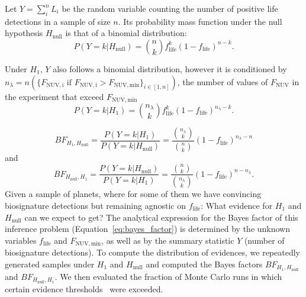 \documentclass[twocolumn,twocolappendix,linenumbers]{aastex631}
\begin{document}
Let $Y=\sum_i^n L_i$ be the random variable counting the number of positive life detections in a sample of size $n$. Its probability mass function under the null hypothesis $H_\mathrm{null}$ is that of a binomial distribution:
\begin{equation}
    \label{eq:semian:likelihoodHnull}
P(Y=k|H_\mathrm{null}) = \binom{n}{k}f_\mathrm{life}^k(1-f_\mathrm{life})^{n-k}.
\end{equation}

Under $H_1$, $Y$ also follows a binomial distribution, however it is conditioned by $n_{\lambda} = n(\{F_\mathrm{NUV, i} \text{ if } F_\mathrm{NUV, i}>F_\mathrm{NUV, min}\}_{i \in [1,n]})$, the number of values of $F_\mathrm{NUV}$ in the experiment that exceed $F_\mathrm{NUV, min}$
\begin{equation}
\label{eq:semian:likelihoodH1}
P(Y=k|H_1) = \binom{n_{\lambda}}{k}f_\mathrm{life}^k(1-f_\mathrm{life})^{n_{\lambda}-k}.
\end{equation}

\begin{equation}\label{eq:bayes_factor}
BF_{H_1,H_\mathrm{null}} = \frac{P(Y=k|H_1)}{P(Y=k|H_\mathrm{null})} = \frac{\binom{n_\lambda}{k}}{\binom{n}{k}}(1-f_\mathrm{life})^{n_{\lambda}-n}
\end{equation}
and
\begin{equation}
    \label{eq:bayes_factor2}
BF_{H_\mathrm{null},H_1} = \frac{P(Y=k|H_\mathrm{null})}{P(Y=k|H_1)} = \frac{\binom{n}{k}}{\binom{n_\lambda}{k}}(1-f_\mathrm{life})^{n-n_{\lambda}}.
\end{equation}
Given a sample of planets, where for some of them we have convincing biosignature detections but remaining agnostic on $f_\mathrm{life}$: What evidence for $H_\mathrm{1}$ and $H_\mathrm{null}$ can we expect to get?
The analytical expression for the Bayes factor of this inference problem (Equation~\ref{eq:bayes_factor}) is determined by the unknown variables $f_\mathrm{life}$ and $F_\mathrm{NUV, min}$, as well as by the summary statistic $Y$ (number of biosignature detections).
To compute the distribution of evidences, we repeatedly generated samples under $H_\mathrm{1}$ and $H_\mathrm{null}$ and computed the Bayes factors $BF_{H_1,H_\mathrm{null}}$ and $BF_{H_\mathrm{null}, H_1}$.
We then evaluated the fraction of Monte Carlo runs in which certain evidence thresholds~\citep{Jeffreys1939} were exceeded.
\end{document}
